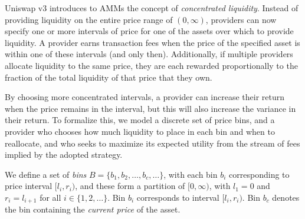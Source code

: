 \documentclass[sigconf, usenames, dvipsnames]{acmart}
\begin{document}
Uniswap v3 introduces to AMMs the concept of \textit{concentrated liquidity}. Instead of providing liquidity on the entire price range of $(0,\infty)$, providers can now specify one or more intervals of price for one of the assets over which to provide liquidity. 
A provider earns transaction fees when the price  of the specified asset is within one of these intervals (and only then). Additionally, if multiple providers allocate liquidity to the same price, they are each rewarded proportionally to the fraction of the total liquidity of that price that they own.


By choosing more concentrated intervals, a provider can increase their return when the price remains in the interval, but this will also increase the variance in their return. To formalize this, we model a discrete set of price bins, and a provider who chooses how much liquidity to place in each bin and when to reallocate, and who seeks to maximize its expected utility from the stream of fees implied by the adopted strategy.
%
\begin{definition}[Bins]
We define a set of {\em bins} $B = \{b_1, b_2, \ldots, b_c, \ldots\}$, with each bin $b_i$ corresponding to price interval $[l_i,r_i)$, and these form a partition of  $[0, \infty)$, with $l_1=0$ and $r_i=l_{i+1}$ for all $i\in \{ 1, 2, \dots \}$. Bin $b_i$ corresponds to interval $[l_i,r_i)$. Bin $b_c$ denotes the bin containing the {\em current price} of the asset.
\end{definition}
\end{document}
